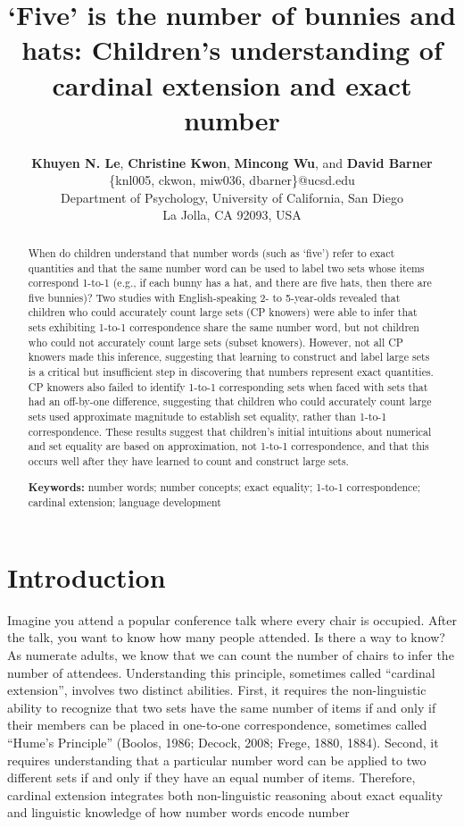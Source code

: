 \documentclass[10pt, letterpaper]{article}
\title{`Five' is the number of bunnies and hats: Children's
understanding of cardinal extension and exact number}
\author{{\large \bf Khuyen N. Le}, {\large \bf Christine Kwon}, {\large \bf Mincong Wu}, and {\large \bf David Barner} \\ \{knl005, ckwon, miw036, dbarner\}@ucsd.edu \\ Department of Psychology, University of California, San Diego \\ La Jolla, CA 92093, USA}
\begin{document}
\maketitle

\begin{abstract}
When do children understand that number words (such as `five') refer to
exact quantities and that the same number word can be used to label two
sets whose items correspond 1-to-1 (e.g., if each bunny has a hat, and
there are five hats, then there are five bunnies)? Two studies with
English-speaking 2- to 5-year-olds revealed that children who could
accurately count large sets (CP knowers) were able to infer that sets
exhibiting 1-to-1 correspondence share the same number word, but not
children who could not accurately count large sets (subset knowers).
However, not all CP knowers made this inference, suggesting that
learning to construct and label large sets is a critical but
insufficient step in discovering that numbers represent exact
quantities. CP knowers also failed to identify 1-to-1 corresponding sets
when faced with sets that had an off-by-one difference, suggesting that
children who could accurately count large sets used approximate
magnitude to establish set equality, rather than 1-to-1 correspondence.
These results suggest that children's initial intuitions about numerical
and set equality are based on approximation, not 1-to-1 correspondence,
and that this occurs well after they have learned to count and construct
large sets.

\textbf{Keywords:}
number words; number concepts; exact equality; 1-to-1 correspondence;
cardinal extension; language development
\end{abstract}

\hypertarget{introduction}{%
\section{Introduction}\label{introduction}}

Imagine you attend a popular conference talk where every chair is
occupied. After the talk, you want to know how many people attended. Is
there a way to know? As numerate adults, we know that we can count the
number of chairs to infer the number of attendees. Understanding this
principle, sometimes called ``cardinal extension'', involves two
distinct abilities. First, it requires the non-linguistic ability to
recognize that two sets have the same number of items if and only if
their members can be placed in one-to-one correspondence, sometimes
called ``Hume's Principle'' (Boolos, 1986; Decock, 2008; Frege, 1880,
1884). Second, it requires understanding that a particular number word
can be applied to two different sets if and only if they have an equal
number of items. Therefore, cardinal extension integrates both
non-linguistic reasoning about exact equality and linguistic knowledge
of how number words encode number
\end{document}
